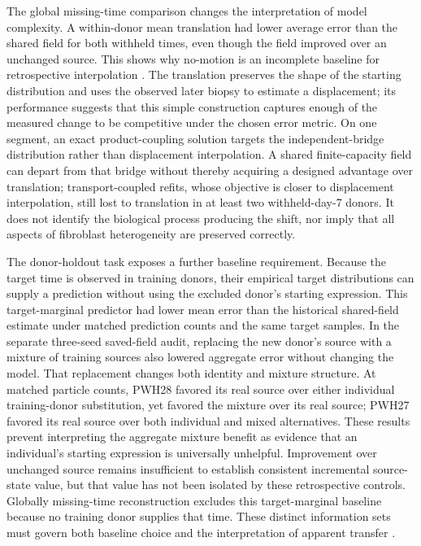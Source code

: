 \documentclass[10pt,a4paper]{article}
\begin{document}
The global missing-time comparison changes the interpretation of model complexity. A within-donor mean translation had lower average error than the shared field for both withheld times, even though the field improved over an unchanged source. This shows why no-motion is an incomplete baseline for retrospective interpolation \citep{schiebinger2019,tong2020trajectory}. The translation preserves the shape of the starting distribution and uses the observed later biopsy to estimate a displacement; its performance suggests that this simple construction captures enough of the measured change to be competitive under the chosen error metric. On one segment, an exact product-coupling solution targets the independent-bridge distribution rather than displacement interpolation. A shared finite-capacity field can depart from that bridge without thereby acquiring a designed advantage over translation; transport-coupled refits, whose objective is closer to displacement interpolation, still lost to translation in at least two withheld-day-7 donors. It does not identify the biological process producing the shift, nor imply that all aspects of fibroblast heterogeneity are preserved correctly.

The donor-holdout task exposes a further baseline requirement. Because the target time is observed in training donors, their empirical target distributions can supply a prediction without using the excluded donor's starting expression. This target-marginal predictor had lower mean error than the historical shared-field estimate under matched prediction counts and the same target samples. In the separate three-seed saved-field audit, replacing the new donor's source with a mixture of training sources also lowered aggregate error without changing the model. That replacement changes both identity and mixture structure. At matched particle counts, PWH28 favored its real source over either individual training-donor substitution, yet favored the mixture over its real source; PWH27 favored its real source over both individual and mixed alternatives. These results prevent interpreting the aggregate mixture benefit as evidence that an individual's starting expression is universally unhelpful. Improvement over unchanged source remains insufficient to establish consistent incremental source-state value, but that value has not been isolated by these retrospective controls. Globally missing-time reconstruction excludes this target-marginal baseline because no training donor supplies that time. These distinct information sets must govern both baseline choice and the interpretation of apparent transfer \citep{roberts2017,cawley2010}.
\end{document}
